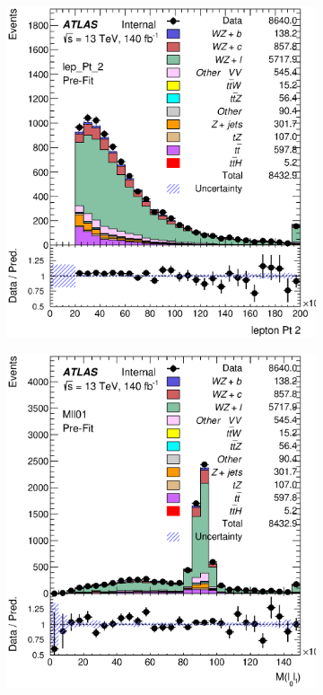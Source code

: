 \documentclass[NOTE, atlasdraft=true, texlive=2016, UKenglish]{\ATLASLATEXPATH atlasdoc}
\begin{document}
\begin{figure}[H]
\begin{subfigure}{.48\textwidth}
        \caption{}
        \label{fig:lep_Pt_1}
    \end{subfigure}\\
        \begin{subfigure}{.48\textwidth}
        \includegraphics[width=1\linewidth]{kinematics/lep_Pt_2.eps}
        \caption{}
        \label{fig:lep_Pt_2}
    \end{subfigure}%
    \begin{subfigure}{.48\textwidth}
        \includegraphics[width=1\linewidth]{kinematics/Mll01.eps}

\end{subfigure}
\end{figure}
\end{document}
